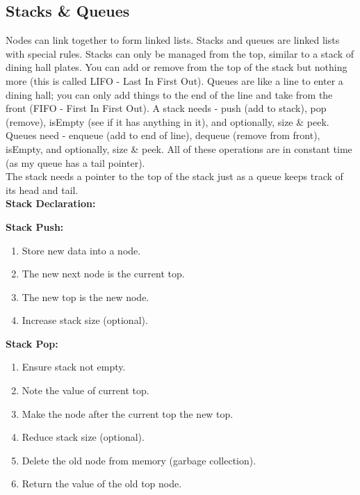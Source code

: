 \documentclass[letterpaper, 10pt]{article}
\begin{document}
\subsection{Stacks \& Queues}
Nodes can link together to form linked lists. Stacks and queues are linked lists with special rules. Stacks can only be managed from the top, similar to a stack of dining hall plates. You can add or remove from the top of the stack but nothing more (this is called LIFO - Last In First Out). Queues are like a line to enter a dining hall; you can only add things to the end of the line and take from the front (FIFO - First In First Out).
\newline
A stack needs - push (add to stack), pop (remove), isEmpty (see if it has anything in it), and optionally, size \& peek. Queues need - enqueue (add to end of line), dequeue (remove from front), isEmpty, and optionally, size \& peek. All of these operations are in constant time (as my queue has a tail pointer). \\
\newline
The stack needs a pointer to the top of the stack just as a queue keeps track of its head and tail.\\
\newpage
\textbf{Stack Declaration:}


\textbf{Stack Push:}
\begin{enumerate}
    \item Store new data into a node.
    \item The new next node is the current top.
    \item The new top is the new node.
    \item Increase stack size (optional).
\end{enumerate}


\newpage
\textbf{Stack Pop:}
\begin{enumerate}
    \item Ensure stack not empty.
    \item Note the value of current top.
    \item Make the node after the current top the new top.
    \item Reduce stack size (optional).
    \item Delete the old node from memory (garbage collection).
    \item Return the value of the old top node.
\end{enumerate}
\end{document}
